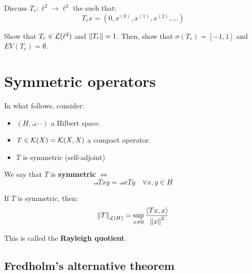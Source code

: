 \begin{fexercise}
    Discuss $T_r: \ell^2 \to \ell^2$ the  such that:
    $$T_r x = (0, x^{(0)}, x^{(1)}, x^{(2)}, ...)$$

    Show that $T_r \in \mathcal{L}(\ell^2)$ and $\left\|T_r\right\| = 1$. Then, show that $\sigma(T_r) = [-1, 1]$
    and $EV(T_r) = \emptyset$.
\end{fexercise}

\section{Symmetric operators}

\begin{note}
    In what follows, consider:
    \begin{itemize}
        \item $(H, \intprod{\cdot}{\cdot})$ a Hilbert space.
        \item $T \in \mathcal{K}(X) = \mathcal{K}(X, X)$ a compact operator.
        \item $T$ is symmetric (self-adjoint)
    \end{itemize}
\end{note}

\begin{fdefinition}
    We say that $T$ is \textbf{symmetric} $\iff$
    $$\intprod{Tx}{y} = \intprod{x}{Ty} \quad \forall x, y \in H$$
\end{fdefinition}

\begin{fremark}
    If $T$ is symmetric, then:
    $$\left\|T\right\|_{\mathcal{L}(H)} = \sup_{x \neq 0} \frac{\left\langle Tx, x \right\rangle}{\left\|x\right\|^2}$$

    This is called the \textbf{Rayleigh quotient}.
\end{fremark}

\vspace{1em}

\subsection{Fredholm's alternative theorem}


